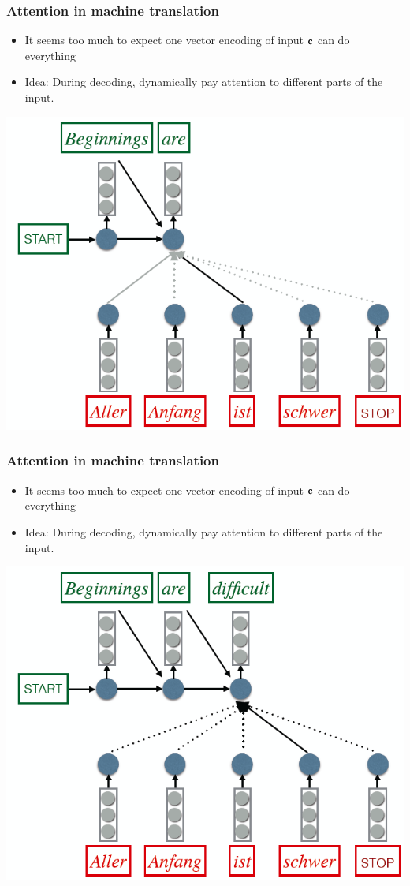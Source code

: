 \documentclass{beamer}
\newcommand{\bi}{\begin{itemize}}
\newcommand{\ei}{\end{itemize}}
\begin{document}
\begin{frame}
\frametitle{Attention in machine translation \cite{bahdanau14translate}}
\bi
\item It seems too much to expect one vector encoding of input $\bf{c}$ can do everything
\item Idea: During decoding, dynamically {\color{red} pay attention} to different parts of the input.
\ei
\centerline{\includegraphics[scale=0.33]{figs/explain_attention2}}
\end{frame}

\begin{frame}
\frametitle{Attention in machine translation \cite{bahdanau14translate}}
\bi
\item It seems too much to expect one vector encoding of input $\bf{c}$ can do everything
\item Idea: During decoding, dynamically {\color{red} pay attention} to different parts of the input.
\ei
\centerline{\includegraphics[scale=0.33]{figs/explain_attention3}}
\end{frame}
\end{document}

